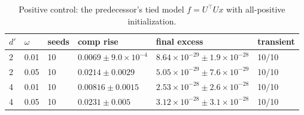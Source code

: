 \begin{table}[t]
\centering
\small
\caption{Positive control: the predecessor's tied model $f=U^\top Ux$ with all-positive initialization.}
\label{tab:E4}
\begin{tabular}{llllll}
\toprule
$d'$ & $\omega$ & seeds & comp rise & final excess & transient \\
\midrule
2 & 0.01 & 10 & $0.0069\pm9.0\times10^{-4}$ & $8.64\times10^{-29}\pm1.9\times10^{-28}$ & 10/10 \\
2 & 0.05 & 10 & $0.0214\pm0.0029$ & $5.05\times10^{-29}\pm7.6\times10^{-29}$ & 10/10 \\
4 & 0.01 & 10 & $0.00816\pm0.0015$ & $2.53\times10^{-28}\pm2.6\times10^{-28}$ & 10/10 \\
4 & 0.05 & 10 & $0.0231\pm0.005$ & $3.12\times10^{-28}\pm3.1\times10^{-28}$ & 10/10 \\
\bottomrule
\end{tabular}
\end{table}
